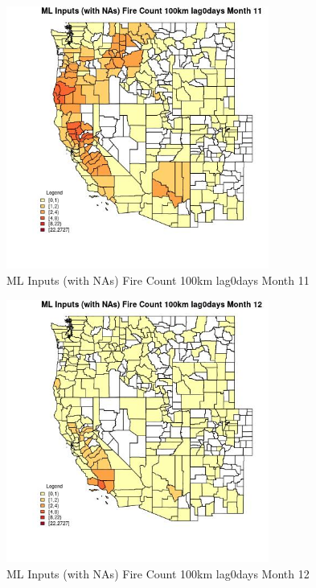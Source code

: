 \begin{figure} 
\centering  
\includegraphics[width=0.77\textwidth]{Code_Outputs/Report_ML_input_PM25_Step4_part_f_de_duplicated_aves_prioritize_24hr_obswNAs_CountyFire_Count_100km_lag0daysmedianMonth11.jpg} 
\caption{\label{fig:Report_ML_input_PM25_Step4_part_f_de_duplicated_aves_prioritize_24hr_obswNAsCountyFire_Count_100km_lag0daysmedianMonth11}ML Inputs (with NAs) Fire Count 100km lag0days Month 11} 
\end{figure} 
 

\begin{figure} 
\centering  
\includegraphics[width=0.77\textwidth]{Code_Outputs/Report_ML_input_PM25_Step4_part_f_de_duplicated_aves_prioritize_24hr_obswNAs_CountyFire_Count_100km_lag0daysmedianMonth12.jpg} 
\caption{\label{fig:Report_ML_input_PM25_Step4_part_f_de_duplicated_aves_prioritize_24hr_obswNAsCountyFire_Count_100km_lag0daysmedianMonth12}ML Inputs (with NAs) Fire Count 100km lag0days Month 12} 
\end{figure} 
 

